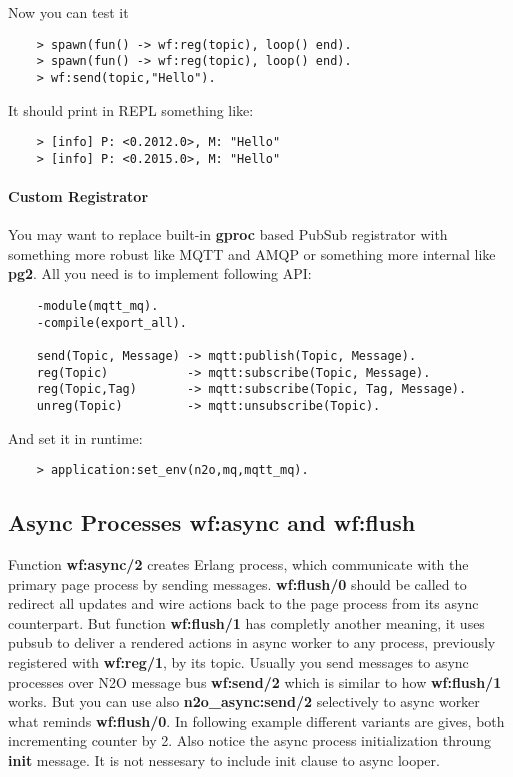 Now you can test it

\begin{lstlisting}
    > spawn(fun() -> wf:reg(topic), loop() end).
    > spawn(fun() -> wf:reg(topic), loop() end).
    > wf:send(topic,"Hello").
\end{lstlisting}

It should print in REPL something like:

\begin{lstlisting}
    > [info] P: <0.2012.0>, M: "Hello"
    > [info] P: <0.2015.0>, M: "Hello"
\end{lstlisting}

\paragraph{\bf Custom Registrator}

You may want to replace built-in {\bf gproc} based PubSub registrator
with something more robust like MQTT and AMQP or something more
internal like {\bf pg2}. All you need is to implement following API:

\vspace{1\baselineskip}
\begin{lstlisting}
    -module(mqtt_mq).
    -compile(export_all).

    send(Topic, Message) -> mqtt:publish(Topic, Message).
    reg(Topic)           -> mqtt:subscribe(Topic, Message).
    reg(Topic,Tag)       -> mqtt:subscribe(Topic, Tag, Message).
    unreg(Topic)         -> mqtt:unsubscribe(Topic).
\end{lstlisting}
\vspace{1\baselineskip}

And set it in runtime:

\vspace{1\baselineskip}
\begin{lstlisting}
    > application:set_env(n2o,mq,mqtt_mq).
\end{lstlisting}

\subsection{Async Processes {\bf wf:async} and {\bf wf:flush}}
Function {\bf wf:async/2} creates Erlang process, which communicate with the primary page
process by sending messages. {\bf wf:flush/0} should be called to redirect all updates and
wire actions back to the page process from its async counterpart. But function {\bf wf:flush/1}
has completly another meaning, it uses pubsub to deliver a rendered actions in async worker to
any process, previously registered with {\bf wf:reg/1}, by its topic.
Usually you send messages to async processes over N2O
message bus {\bf wf:send/2} which is similar to how {\bf wf:flush/1} works.
But you can use also {\bf n2o\_async:send/2} selectively to async worker what reminds
{\bf wf:flush/0}. In following
example different variants are gives, both incrementing counter by 2. Also notice
the async process initialization throung {\bf init} message. It is not nessesary
to include init clause to async looper.

